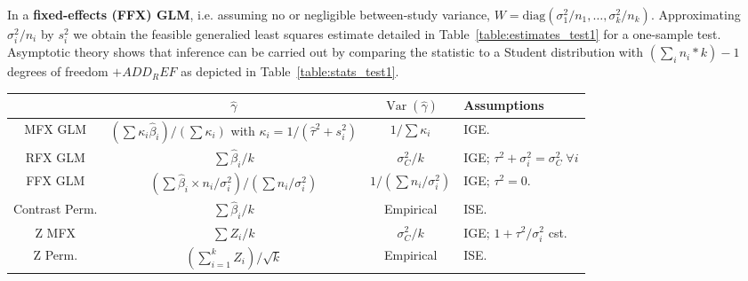 \documentclass[preprint]{elsarticle}
\DeclareMathOperator{\Var}{Var}
\newcommand{\effectvector}{\hat\beta}
\newcommand{\effect}[1][i]{\effectvector_{#1}}
\newcommand{\vareffect}[1][i]{s^2_{#1}}
\newcommand{\zeffect}[1][\studyidx]{Z_{#1}}
\newcommand{\peffect}[1][\studyidx]{P_{#1}}
\newcommand{\nStudies}{k}
\newcommand{\studyidx}{i}
\newcommand{\varCombined}{\sigma^2_{C}}
\newcommand{\metaanalyticeffect}{\gamma}
\newcommand{\varBetween}{\tau^2}
\newcommand{\estvarBetween}{\hat\tau^2}
\newcommand{\sampleSize}[1][i]{n_{#1}}
\newcommand{\varWithin}[1][i]{\sigma^2_{#1}}
\newcommand{\varWithinCon}[1][i]{\sigma^2_{#1} / \sampleSize[#1]}
\newcommand{\varWithinConInv}[1][i]{\sampleSize[#1] / \sigma^2_{#1}}
\begin{document}
In a \textbf{fixed-effects (FFX) GLM}, i.e. assuming no or negligible between-study variance, $W = \mathrm{diag}( \varWithinCon[1], \ldots ,\varWithinCon[\nStudies])$. Approximating $\varWithinCon$ by $\vareffect$ we obtain the feasible generalied least squares estimate detailed in Table~\ref{table:estimates_test1} for a one-sample test. Asymptotic theory shows that inference can be carried out by comparing the statistic to a Student distribution with $(\sum_{\studyidx} n_\studyidx*\nStudies)-1$ degrees of freedom $+ADD_REF$ as depicted in  Table~\ref{table:stats_test1}. 



\begin{table*}[t]
\begin{center}
\setlength{\tabcolsep}{3pt}
\begin{tabular}{cccl}
				& $\hat \metaanalyticeffect$			& $\Var(\hat \metaanalyticeffect)$ &  Assumptions\\
\hline						
MFX GLM 		& $ \left( \sum \kappa_i \effect \right) / \left( \sum \kappa_i \right)$ with $\kappa_i = 1/(\estvarBetween + \vareffect)$ & $1/\sum \kappa_i$ & IGE.\\
RFX GLM 		& $ \sum \effect/\nStudies $ & $ \varCombined/\nStudies $  & IGE; $\varBetween+\varWithin = \varCombined\; \forall i$ \\
FFX GLM 		& $ \left( \sum \effect \times \varWithinConInv \right) / \left(\sum \varWithinConInv \right)$ & $1/(\sum \varWithinConInv)$ & IGE; $\varBetween=0$.\\
Contrast Perm.	& $ \sum \effect/\nStudies $ & Empirical & ISE.\\
Z MFX 		& $ \sum \zeffect/\nStudies $ & $ \varCombined/\nStudies $  & IGE; $1 + \varBetween/\varWithin$ cst.\\
Z Perm.	& $\left(  \sum_{i=1}^\nStudies \zeffect \right) / \sqrt{\nStudies}$ & Empirical & ISE.\\
\hline 

\end{tabular}
\end{center}
\caption{One-sample meta-analytic estimates, sampling variance and associated assumptions. Note: $\peffect = \Phi(-\zeffect)$}
\label{table:estimates_test1}
\end{table*}
\end{document}
